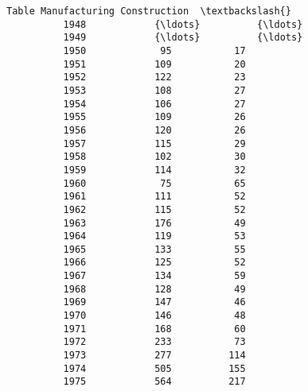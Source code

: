 \documentclass[11pt]{article}
\begin{document}
\begin{Verbatim}[commandchars=\\\{\}]
          Table Manufacturing Construction  \textbackslash{}
          1948            {\ldots}          {\ldots}   
          1949            {\ldots}          {\ldots}   
          1950             95           17   
          1951            109           20   
          1952            122           23   
          1953            108           27   
          1954            106           27   
          1955            109           26   
          1956            120           26   
          1957            115           29   
          1958            102           30   
          1959            114           32   
          1960             75           65   
          1961            111           52   
          1962            115           52   
          1963            176           49   
          1964            119           53   
          1965            133           55   
          1966            125           52   
          1967            134           59   
          1968            128           49   
          1969            147           46   
          1970            146           48   
          1971            168           60   
          1972            233           73   
          1973            277          114   
          1974            505          155   
          1975            564          217   
          

\end{Verbatim}
\end{document}
